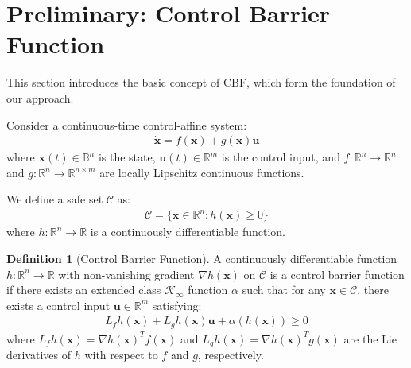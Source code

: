 \documentclass[fleqn,10pt,twocolumn]{SICE_FES25}
\theoremstyle{definition}
\newtheorem{definition}{Definition}
\theoremstyle{plain}
\begin{document}
\section{Preliminary: Control Barrier Function}

This section introduces the basic concept of CBF\cite{ref6}, which form the foundation of our approach.

Consider a continuous-time control-affine system:
\begin{equation}
\begin{aligned}
\dot{{\mathbf{x}}} = f({\mathbf{x}}) + g({\mathbf{x}}){\mathbf{u}}
\label{eq:control_affine}
\end{aligned}
\end{equation}
where ${\mathbf{x}}(t) \in {\mathbb{B}}^n$ is the state, ${\mathbf{u}}(t) \in {\mathbb{R}}^m$ is the control input, and $f: {\mathbb{R}}^n \rightarrow {\mathbb{R}}^n$ and $g: {\mathbb{R}}^n \rightarrow {\mathbb{R}}^{n \times m}$ are locally Lipschitz continuous functions.

We define a safe set ${\mathcal{C}}$ as:
\begin{equation}
\begin{aligned}
{\mathcal{C}} = \{{\mathbf{x}} \in {\mathbb{R}}^n : h({\mathbf{x}}) \geq 0\}
\label{eq:safe_set}
\end{aligned}
\end{equation}
where $h: {\mathbb{R}}^n \rightarrow {\mathbb{R}}$ is a continuously differentiable function.

\begin{definition}[Control Barrier Function\cite{ref6}]
A continuously differentiable function $h: {\mathbb{R}}^n \rightarrow {\mathbb{R}}$ with non-vanishing gradient $\nabla h({\mathbf{x}})$ on ${\mathcal{C}}$ is a control barrier function if there exists an extended class $\mathcal{K}_{\infty}$ function $\alpha$ such that for any ${\mathbf{x}} \in {\mathcal{C}}$, there exists a control input ${\mathbf{u}} \in {\mathbb{R}}^m$ satisfying:
\begin{equation}
\begin{aligned}
L_f h({\mathbf{x}}) + L_g h({\mathbf{x}}){\mathbf{u}} + \alpha(h({\mathbf{x}})) \geq 0
\label{eq:cbf_condition}
\end{aligned}
\end{equation}
where $L_f h({\mathbf{x}}) = \nabla h({\mathbf{x}})^T f({\mathbf{x}})$ and $L_g h({\mathbf{x}}) = \nabla h({\mathbf{x}})^T g({\mathbf{x}})$ are the Lie derivatives of $h$ with respect to $f$ and $g$, respectively.
\end{definition}
\end{document}
